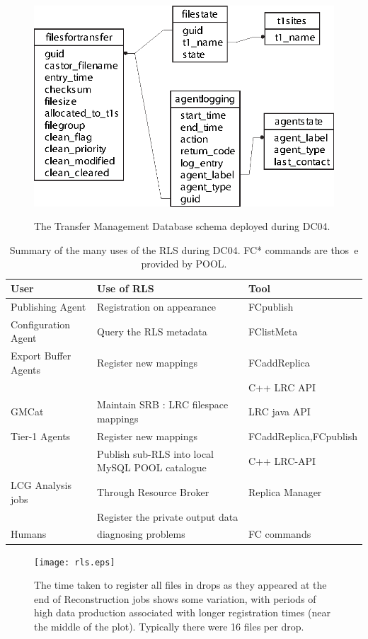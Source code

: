 \documentclass{cmspaper}
\begin{document}
\clearpage
\begin{figure}[tbp]
\centering
\includegraphics{v1_tmdb.eps}
\label{fig:schema}
\caption{The Transfer Management Database schema deployed during DC04.}
\end{figure}
\clearpage
\begin{table}
\begin{tabular}[tbp]{|l|l|l|}
\hline User & Use of RLS & Tool
\\ \hline Publishing Agent & Registration on appearance & FCpublish
\\ Configuration Agent & Query the RLS metadata & FClistMeta
\\ Export Buffer Agents & Register new mappings & FCaddReplica
\\ & & C++ LRC API
\\ GMCat & Maintain SRB : LRC filespace mappings & LRC java API
\\ Tier-1 Agents & Register new mappings & FCaddReplica,FCpublish
\\ & Publish sub-RLS into local MySQL POOL catalogue & C++ LRC-API
\\ LCG Analysis jobs & Through Resource Broker & Replica Manager
\\ & Register the private output data &
\\ Humans & diagnosing problems & FC commands
\\ \hline
\end{tabular}
\label{table:rls}
\caption{Summary of the many uses of the RLS during DC04. FC* commands are thos\
e provided by POOL.}
\end{table}
\clearpage
\begin{figure}[tbp]
\centering
\texttt{[image: rls.eps]}
\label{fig:rls}
\caption{The time taken to register all files in drops as they
appeared at the end of Reconstruction jobs shows some variation,
with periods of high data production associated with longer
registration times (near the middle of the plot). Typically there
were 16 files per drop.}
\end{figure}
\end{document}
